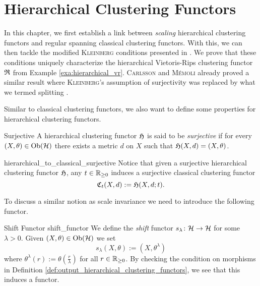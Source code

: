 \chapter{Hierarchical Clustering Functors}
\label{chapter__hierarchical}
In this chapter, we first establish a link between \emph{scaling} hierarchical clustering functors and regular spanning classical clustering functors.
%
With this, we can then tackle the modified \textsc{Kleinberg} conditions presented in \cite[Sec.~7.3.1]{Carlsson2010}.
We prove that these conditions uniquely characterize the hierarchical Vietoris-Rips clustering functor $\mathfrak{R}$ from Example \ref{exa:hierarchical_vr}. \textsc{Carlsson} and \textsc{M\'emoli} already proved a similar result where \textsc{Kleinberg}'s assumption of surjectivity was replaced by what we termed splitting \cite[Thm.~18]{JMLR:v11:carlsson10a}.


Similar to classical clustering functors, we also want to define some properties for hierarchical clustering functors.

\begin{definition}{Surjective}{}
A hierarchical clustering functor $\mathfrak{H}$ is said to be \emph{surjective} if for every ${(X, \theta) \in \mathrm {Ob}(\mathcal{H})}$ there exists a metric $d$ on $X$ such that $\mathfrak{H}(X,d) = (X, \theta)$.
\end{definition}

\begin{myremark}{}{hierarchical_to_classical_surjective}
Notice that given a surjective hierarchical clustering functor $\mathfrak{H}$, any $t \in \mathbb R_{\geq0}$ induces a surjective classical clustering functor
$$
\mathfrak{C}_t(X,d) := \mathfrak{H}(X, d; t).
$$
\end{myremark}


To discuss a similar notion as scale invariance we need to introduce the following functor.

\begin{definition}{Shift Functor \cite[Ex.~4.3]{Carlsson2010}}{shift_functor}
We define the \emph{shift} functor $s_\lambda\colon \mathcal{H} \to \mathcal{H}$ for some $\lambda > 0$. Given $(X, \theta) \in \mathrm {Ob}(\mathcal{H})$ we set
$$
s_\lambda(X, \theta) := (X, \theta^\lambda)
$$
where $\theta^\lambda(r) := \theta(\frac{r}{\lambda})$ for all $r \in \mathbb R_{\geq0}$.
By checking the condition on morphisms in Definition \ref{def:output_hierarchical_clustering_functors}, we see that this induces a functor.
\end{definition}

